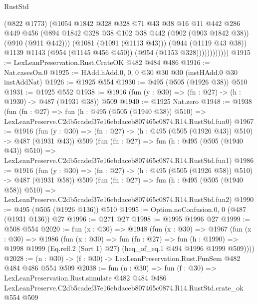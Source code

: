 \begin{lexlean}{RustStd}
\begin{coremodule}
                      (@822 @1773)
                      (@1054
                        @1842
                        @328
                        @328
                        @71
                        @43
                        @38
                        @16
                        @11
                        @442
                        @286
                        @449
                        @456
                        (@894
                          @1842
                          @328
                          @38
                          @102
                          @38
                          @442
                          (@902 (@903 @1842 @38))
                          (@910 (@911 @442)))
                        (@1081 (@1091 (@1113 @43)))
                        (@944 (@1119 @43 @38))
                        @1139
                        @1143
                        (@954 (@1145 @456 @450))
                        (@954 (@1153 @328))))))))))))
@1915 := LexLeanPreservation.Rust.CrateOK @482 @484 @486
@1916 := Nat.casesOn.{0}
@1925 := HAdd.hAdd.{0, 0, 0} @30 @30 @30 (instHAdd.{0} @30 instAddNat)
@1926 := @1925 @554
@1930 := @495 (@505 (@1926 @38)) @510
@1931 := @1925 @552
@1938 := @1916 (fun (y : @30) => (fn : @27) -> (h : @1930) -> @487 (@1931 @38)) @509
@1940 := @1925 Nat.zero
@1948 := @1938
    (fun (fn : @27) =>
    fun (h : @495 (@505 (@1940 @38)) @510) =>
    LexLeanPreserve.C2db5cadef37e16ebdaceb807465c0874.R14.RustStd.fun0)
@1967 := @1916
    (fun (y : @30) => (fn : @27) -> (h : @495 (@505 (@1926 @43)) @510) -> @487 (@1931 @43))
    @509
    (fun (fn : @27) =>
    fun (h : @495 (@505 (@1940 @43)) @510) =>
    LexLeanPreserve.C2db5cadef37e16ebdaceb807465c0874.R14.RustStd.fun1)
@1986 := @1916
    (fun (y : @30) => (fn : @27) -> (h : @495 (@505 (@1926 @58)) @510) -> @487 (@1931 @58))
    @509
    (fun (fn : @27) =>
    fun (h : @495 (@505 (@1940 @58)) @510) =>
    LexLeanPreserve.C2db5cadef37e16ebdaceb807465c0874.R14.RustStd.fun2)
@1990 := @495 (@505 (@1926 @136)) @510
@1995 := Option.noConfusion.{0, 0} (@487 (@1931 @136)) @27
@1996 := @271 @27
@1998 := @1995 @1996 @27
@1999 := @508 @554
@2020 := fun (x : @30) =>
  @1948
    (fun (x : @30) =>
    @1967
      (fun (x : @30) =>
      @1986
        (fun (x : @30) =>
        fun (fn : @27) =>
        fun (h : @1990) =>
        @1998 @1999 (Eq.refl.{2} (Sort 1) @27) (heq_of_eq.{1} @494 @1996 @1999 @509))))
@2028 := (n : @30) -> (f : @30) -> LexLeanPreservation.Rust.FunSem @482 @484 @486 @554 @509
@2038 := fun (n : @30) =>
  fun (f : @30) =>
  LexLeanPreservation.Rust.simulate
    @482
    @484
    @486
    LexLeanPreserve.C2db5cadef37e16ebdaceb807465c0874.R14.RustStd.crate_ok
    @554
    @509
\end{coremodule}
\end{lexlean}
